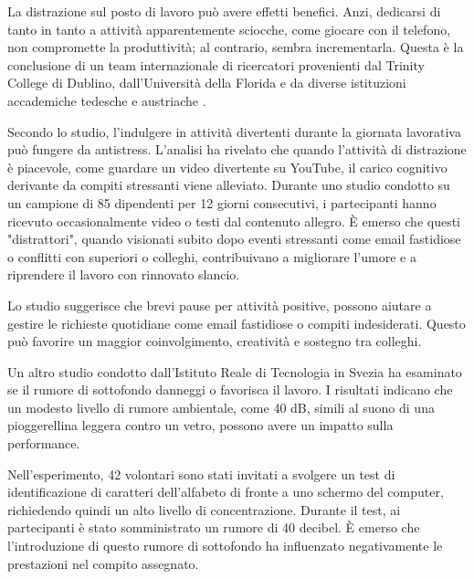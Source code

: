 \documentclass[12pt]{book} %
\begin{document}
\begin{mdframed}[linewidth=1pt]
La distrazione sul posto di lavoro può avere effetti benefici. Anzi, dedicarsi di tanto in tanto a attività apparentemente sciocche, come giocare con il telefono, non compromette la produttività; al contrario, sembra incrementarla. Questa è la conclusione di un team internazionale di ricercatori provenienti dal Trinity College di Dublino, dall'Università della Florida e da diverse istituzioni accademiche tedesche e austriache .

Secondo lo studio, l'indulgere in attività divertenti durante la giornata lavorativa può fungere da antistress. L'analisi ha rivelato che quando l'attività di distrazione è piacevole, come guardare un video divertente su YouTube, il carico cognitivo derivante da compiti stressanti viene alleviato. Durante uno studio condotto su un campione di 85 dipendenti per 12 giorni consecutivi, i partecipanti hanno ricevuto occasionalmente video o testi dal contenuto allegro. È emerso che questi "distrattori", quando visionati subito dopo eventi stressanti come email fastidiose o conflitti con superiori o colleghi, contribuivano a migliorare l'umore e a riprendere il lavoro con rinnovato slancio.

Lo studio suggerisce che brevi pause per attività positive, possono aiutare a gestire le richieste quotidiane come email fastidiose o compiti indesiderati. Questo può favorire un maggior coinvolgimento, creatività e sostegno tra colleghi.

Un altro studio condotto dall'Istituto Reale di Tecnologia in Svezia ha esaminato se il rumore di sottofondo danneggi o favorisca il lavoro. I risultati indicano che un modesto livello di rumore ambientale, come 40 dB, simili al suono di una pioggerellina leggera contro un vetro, possono avere un impatto sulla performance.

Nell'esperimento, 42 volontari sono stati invitati a svolgere un test di identificazione di caratteri dell'alfabeto di fronte a uno schermo del computer, richiedendo quindi un alto livello di concentrazione. Durante il test, ai partecipanti è stato somministrato un rumore di 40 decibel. È emerso che l'introduzione di questo rumore di sottofondo ha influenzato negativamente le prestazioni nel compito assegnato.
\end{mdframed}
\end{document}
